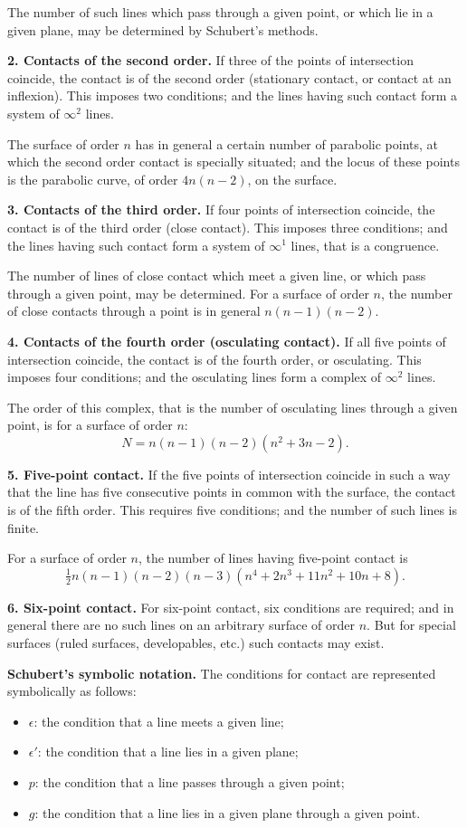 \documentclass[12pt,a4paper]{article}
\begin{document}
The number of such lines which pass through a given point, or which lie
in a given plane, may be determined by Schubert's methods.

\textbf{2. Contacts of the second order.} If three of the points of intersection
coincide, the contact is of the second order (stationary contact, or contact
at an inflexion). This imposes two conditions; and the lines having such
contact form a system of $\infty^2$ lines.

The surface of order $n$ has in general a certain number of parabolic points,
at which the second order contact is specially situated; and the locus of
these points is the parabolic curve, of order $4n(n-2)$, on the surface.

\textbf{3. Contacts of the third order.} If four points of intersection coincide,
the contact is of the third order (close contact). This imposes three
conditions; and the lines having such contact form a system of $\infty^1$ lines,
that is a congruence.

The number of lines of close contact which meet a given line, or which
pass through a given point, may be determined. For a surface of order $n$,
the number of close contacts through a point is in general $n(n-1)(n-2)$.

\textbf{4. Contacts of the fourth order (osculating contact).} If all five points of
intersection coincide, the contact is of the fourth order, or osculating. This
imposes four conditions; and the osculating lines form a complex of
$\infty^2$ lines.

The order of this complex, that is the number of osculating lines through
a given point, is for a surface of order $n$:
%
\[
N = n(n-1)(n-2)(n^2 + 3n - 2).
\]

\textbf{5. Five-point contact.} If the five points of intersection coincide in such a
way that the line has five consecutive points in common with the surface,
the contact is of the fifth order. This requires five conditions; and the
number of such lines is finite.

For a surface of order $n$, the number of lines having five-point contact is
%
\[
\tfrac{1}{2} n(n-1)(n-2)(n-3)(n^4 + 2n^3 + 11n^2 + 10n + 8).
\]

\textbf{6. Six-point contact.} For six-point contact, six conditions are required;
and in general there are no such lines on an arbitrary surface of order $n$.
But for special surfaces (ruled surfaces, developables, etc.) such contacts
may exist.

\textbf{Schubert's symbolic notation.} The conditions for contact are represented
symbolically as follows:
\begin{itemize}
\item $\epsilon$: the condition that a line meets a given line;
\item $\epsilon'$: the condition that a line lies in a given plane;
\item $p$: the condition that a line passes through a given point;
\item $g$: the condition that a line lies in a given plane through a given point.
\end{itemize}
\end{document}
